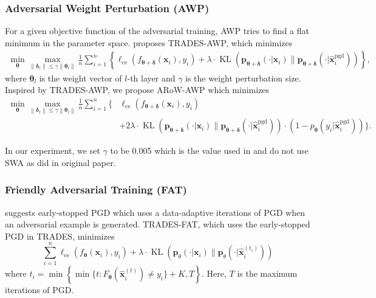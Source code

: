 \documentclass[nohyperref]{article}
\theoremstyle{plain}
\theoremstyle{definition}
\theoremstyle{remark}
\begin{document}
\subsubsection{Adversarial Weight Perturbation (AWP)}
For a given objective function of the adversarial training, AWP \citep{wu2020adversarial} tries to find a flat minimum in the parameter space. \cite{wu2020adversarial} proposes TRADES-AWP, which minimizes
\begin{align*}
    \min _{\bm{\theta}} \max _{\left\|\bm{\delta}_l\right\| \leq \gamma\left\|\bm{\theta}_l\right\|} \frac{1}{n} \sum_{i=1}^n \left\{ \ell_{\text{ce}}(f_{\bm{\theta}+\bm{\delta}}(\bm{x}_i), y_i) + \lambda \cdot \operatorname{KL} (\mathbf{p}_{\bm{\theta}+\bm{\delta}}(\cdot|\bm{x}_i)\lVert \mathbf{p}_{{\bm{\theta}+\bm{\delta}}}(\cdot|\widehat{\bm{x}}^{\text{pgd}}_i))\right\},
\end{align*}
where  $\bm{\theta}_l$ is the weight vector of $l$-th layer
and $\gamma$ is the weight perturbation size.
Inspired by TRADES-AWP, we propose ARoW-AWP which minimizes
\begin{align*}
    \min _{\bm{\theta}} \max _{\left\|\bm{\delta}_l\right\| \leq \gamma\left\|\bm{\theta}_l\right\|} \frac{1}{n} \sum_{i=1}^n \Big\{ & \ell_{\text{ce}}(f_{\bm{\theta}+\bm{\delta}}(\bm{x}_i), y_i) \\
    & +2 \lambda \cdot \operatorname{KL} (\mathbf{p}_{\bm{\theta}+\bm{\delta}}(\cdot|\bm{x}_i)\lVert \mathbf{p}_{{\bm{\theta}+\bm{\delta}}}(\cdot|\widehat{\bm{x}}^{\text{pgd}}_i))
    \cdot  (1 - p_{\bm{\theta}}(y_i | \widehat{\bm{x}}^{\text{pgd}}_i) ) \Big\}.
\end{align*}

In our experiment, we set $\gamma$ to be 0.005 which is the value used in \cite{wu2020adversarial} and do not use SWA as did in original paper.

\subsubsection{Friendly Adversarial Training (FAT)}
\citet{zhang2020attacks} suggests early-stopped PGD which uses a data-adaptive iterations
of PGD when an adversarial example is generated. TRADES-FAT, which uses the early-stopped PGD
in TRADES, minimizes
\begin{equation*}
    \sum\limits_{i=1}^n \ell_{\text{ce}}(f_{\bm{\theta}}(\bm{x}_i), y_i) + \lambda \cdot\operatorname{KL} (\mathbf{p}_{\theta }(\cdot|\bm{x}_i)\lVert \mathbf{p}_{\theta }(\cdot|\widehat{\bm{x}}^{(t_i)}_{i}))
\end{equation*}
where $t_i =  \min  \left\{ \min \{t : F_{\bm{\theta}}(\widehat{\bm{x}}_i^{(t)}) \neq y_i \} + K, T \right\}.$ Here, $T$ is the maximum iterations of PGD. 
\end{document}
